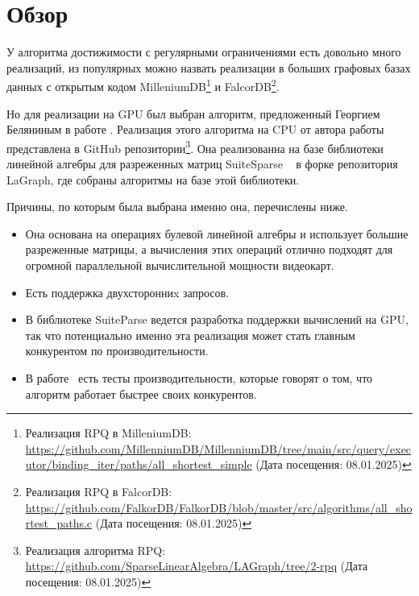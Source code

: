 
\section{Обзор}
\label{sec:relatedworks}


У алгоритма достижимости с регулярными ограничениями есть довольно много реализаций, из популярных можно назвать реализации в больших графовых базах данных с открытым кодом
MilleniumDB\footnote{Реализация RPQ в MilleniumDB: \url{https://github.com/MillenniumDB/MillenniumDB/tree/main/src/query/executor/binding_iter/paths/all_shortest_simple} (Дата посещения: 08.01.2025)} и
FalcorDB\footnote{Реализация RPQ в FalcorDB: \url{https://github.com/FalkorDB/FalkorDB/blob/master/src/algorithms/all_shortest_paths.c} (Дата посещения: 08.01.2025)}.

Но для реализации на GPU был выбран алгоритм, предложенный Георгием Беляниным в работе \cite{OldRpqVkr}. Реализация этого алгоритма на CPU от автора работы представлена в GitHub репозитории\footnote{Реализация алгоритма RPQ: \url{https://github.com/SparseLinearAlgebra/LAGraph/tree/2-rpq} (Дата посещения: 08.01.2025)}. Она реализованна на базе библиотеки линейной алгебры для разреженных матриц SuiteSparse ~\cite{SuiteSparse} в форке репозитория LaGraph, где собраны алгоритмы на базе этой библиотеки.

Причины, по которым была выбрана именно она, перечислены ниже.
\begin{itemize}
    \item Она основана на операциях булевой линейной алгебры и использует большие разреженные матрицы, а вычисления этих операций отлично подходят для огромной параллельной вычислительной мощности видеокарт.
    \item Есть поддержка двухсторонниx запросов.
    \item В библиотеке SuiteParse ведется разработка поддержки вычислений на GPU, так что потенциально именно эта реализация может стать главным конкурентом по производительности.
    \item В работе~\cite{rpq-article-cool} есть тесты производительности, которые говорят о том, что алгоритм работает быстрее своих конкурентов.
\end{itemize}

